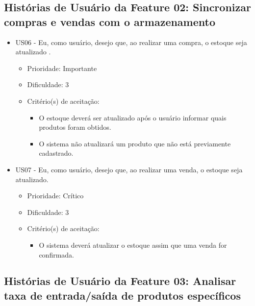 \subsection{Histórias de Usuário da Feature 02: Sincronizar compras e vendas com o armazenamento}
\begin{itemize}

\item US06 - Eu, como usuário, desejo que, ao realizar uma compra, o estoque seja atualizado .
    \begin{itemize}
    \item Prioridade: Importante
    \item Dificuldade: 3
    \item Critério(s) de aceitação:
			\begin{itemize}
				\item O estoque deverá ser atualizado após o usuário informar quais produtos foram obtidos.
				\item O sistema não atualizará um produto que não está previamente cadastrado.
			\end{itemize}
    \end{itemize}

\item US07 - Eu, como usuário, desejo que, ao realizar uma venda, o estoque seja atualizado.
    \begin{itemize}
    \item Prioridade: Crítico
    \item Dificuldade: 3
    \item Critério(s) de aceitação:
			\begin{itemize}
				\item O sistema deverá atualizar o estoque assim que uma venda for confirmada.
			\end{itemize}
    \end{itemize}

\end{itemize}

\subsection{Histórias de Usuário da Feature 03: Analisar taxa de entrada/saída de produtos específicos}

